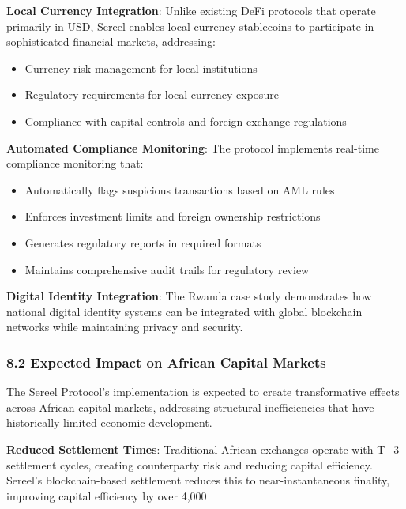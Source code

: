 \documentclass[12pt]{article}
\begin{document}
\textbf{Local Currency Integration}: Unlike existing DeFi protocols that operate primarily in USD, Sereel enables local currency stablecoins to participate in sophisticated financial markets, addressing:
\begin{itemize}
	\item Currency risk management for local institutions
	\item Regulatory requirements for local currency exposure
	\item Compliance with capital controls and foreign exchange regulations

\end{itemize}
\textbf{Automated Compliance Monitoring}: The protocol implements real-time compliance monitoring that:
\begin{itemize}
	\item Automatically flags suspicious transactions based on AML rules
	\item Enforces investment limits and foreign ownership restrictions
	\item Generates regulatory reports in required formats
	\item Maintains comprehensive audit trails for regulatory review

\end{itemize}
\textbf{Digital Identity Integration}: The Rwanda case study demonstrates how national digital identity systems can be integrated with global blockchain networks while maintaining privacy and security.

\subsubsection{8.2 Expected Impact on African Capital Markets} %

The Sereel Protocol's implementation is expected to create transformative effects across African capital markets, addressing structural inefficiencies that have historically limited economic development.


\textbf{Reduced Settlement Times}: Traditional African exchanges operate with T+3 settlement cycles, creating counterparty risk and reducing capital efficiency. Sereel's blockchain-based settlement reduces this to near-instantaneous finality, improving capital efficiency by over 4,000%
\end{document}
